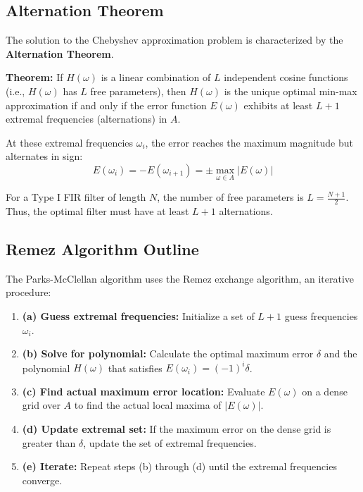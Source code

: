 \documentclass[11pt,a4paper]{article}
\begin{document}
\subsection{Alternation Theorem}
The solution to the Chebyshev approximation problem is characterized by the \textbf{Alternation Theorem}.

\textbf{Theorem:} If $H(\omega)$ is a linear combination of $L$ independent cosine functions (i.e., $H(\omega)$ has $L$ free parameters), then $H(\omega)$ is the unique optimal min-max approximation if and only if the error function $E(\omega)$ exhibits at least $L+1$ extremal frequencies (alternations) in $A$.

At these extremal frequencies $\omega_i$, the error reaches the maximum magnitude but alternates in sign:
\begin{equation}
E(\omega_i) = -E(\omega_{i+1}) = \pm \max_{\omega \in A} |E(\omega)|
\end{equation}

For a Type I FIR filter of length $N$, the number of free parameters is $L = \frac{N+1}{2}$. Thus, the optimal filter must have at least $L+1$ alternations.

\subsection{Remez Algorithm Outline}
The Parks-McClellan algorithm uses the Remez exchange algorithm, an iterative procedure:
\begin{enumerate}
    \item \textbf{(a) Guess extremal frequencies:} Initialize a set of $L+1$ guess frequencies $\omega_i$.
    \item \textbf{(b) Solve for polynomial:} Calculate the optimal maximum error $\delta$ and the polynomial $H(\omega)$ that satisfies $E(\omega_i) = (-1)^i \delta$.
    \item \textbf{(c) Find actual maximum error location:} Evaluate $E(\omega)$ on a dense grid over $A$ to find the actual local maxima of $|E(\omega)|$.
    \item \textbf{(d) Update extremal set:} If the maximum error on the dense grid is greater than $\delta$, update the set of extremal frequencies.
    \item \textbf{(e) Iterate:} Repeat steps (b) through (d) until the extremal frequencies converge.
\end{enumerate}
\end{document}
